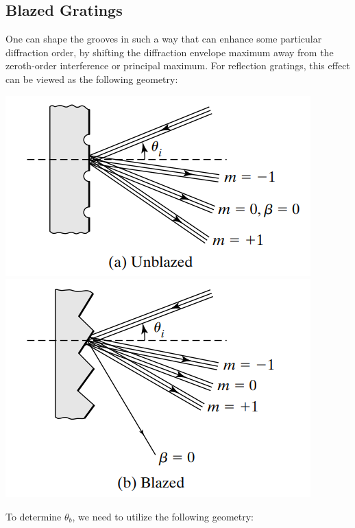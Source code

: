 \documentclass[11pt]{book}
\theoremstyle{break}
\theoremstyle{break}
\begin{document}
\subsection{Blazed Gratings}
One can shape the grooves in such a way that can enhance some particular diffraction order, by shifting the diffraction envelope maximum away from the zeroth-order interference or principal maximum. For reflection gratings, this effect can be viewed as the following geometry:
\begin{center}
\includegraphics[scale=0.69]{unblazedReflec}\qquad
\includegraphics[scale=0.69]{blazedReflec}
\end{center}
To determine $\theta_b$, we need to utilize the following geometry:
\end{document}
